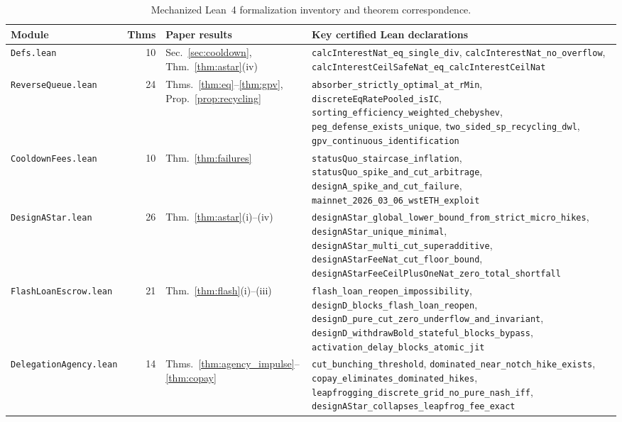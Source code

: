 \begin{table}[t]
\centering
\begin{threeparttable}
\caption{Mechanized Lean~4 formalization inventory and theorem correspondence.}
\label{tab:lean}
\footnotesize
\setlength{\tabcolsep}{4pt}
\begin{tabular}{@{}l r >{\raggedright\arraybackslash}p{2.7cm} >{\raggedright\arraybackslash}p{8.5cm}@{}}
\toprule
Module & Thms & Paper results & Key certified Lean declarations \\
\midrule
\texttt{Defs.lean} & 10 & Sec.~\ref{sec:cooldown}, Thm.~\ref{thm:astar}(iv) &
{\scriptsize\texttt{calcInterestNat\_eq\_single\_div}, \texttt{calcInterestNat\_no\_overflow}, \texttt{calcInterestCeilSafeNat\_eq\_calcInterestCeilNat}} \\
\addlinespace[3pt]
\texttt{ReverseQueue.lean} & 24 & Thms.~\ref{thm:eq}--\ref{thm:gpv}, Prop.~\ref{prop:recycling} &
{\scriptsize\texttt{absorber\_strictly\_optimal\_at\_rMin}, \texttt{discreteEqRatePooled\_isIC}, \texttt{sorting\_efficiency\_weighted\_chebyshev}, \texttt{peg\_defense\_exists\_unique}, \texttt{two\_sided\_sp\_recycling\_dwl}, \texttt{gpv\_continuous\_identification}} \\
\addlinespace[3pt]
\texttt{CooldownFees.lean} & 10 & Thm.~\ref{thm:failures} &
{\scriptsize\texttt{statusQuo\_staircase\_inflation}, \texttt{statusQuo\_spike\_and\_cut\_arbitrage}, \texttt{designA\_spike\_and\_cut\_failure}, \texttt{mainnet\_2026\_03\_06\_wstETH\_exploit}} \\
\addlinespace[3pt]
\texttt{DesignAStar.lean} & 26 & Thm.~\ref{thm:astar}(i)--(iv) &
{\scriptsize\texttt{designAStar\_global\_lower\_bound\_from\_strict\_micro\_hikes}, \texttt{designAStar\_unique\_minimal}, \texttt{designAStar\_multi\_cut\_superadditive}, \texttt{designAStarFeeNat\_cut\_floor\_bound}, \texttt{designAStarFeeCeilPlusOneNat\_zero\_total\_shortfall}} \\
\addlinespace[3pt]
\texttt{FlashLoanEscrow.lean} & 21 & Thm.~\ref{thm:flash}(i)--(iii) &
{\scriptsize\texttt{flash\_loan\_reopen\_impossibility}, \texttt{designD\_blocks\_flash\_loan\_reopen}, \texttt{designD\_pure\_cut\_zero\_underflow\_and\_invariant}, \texttt{designD\_withdrawBold\_stateful\_blocks\_bypass}, \texttt{activation\_delay\_blocks\_atomic\_jit}} \\
\addlinespace[3pt]
\texttt{DelegationAgency.lean} & 14 & Thms.~\ref{thm:agency_impulse}--\ref{thm:copay} &
{\scriptsize\texttt{cut\_bunching\_threshold}, \texttt{dominated\_near\_notch\_hike\_exists}, \texttt{copay\_eliminates\_dominated\_hikes}, \texttt{leapfrogging\_discrete\_grid\_no\_pure\_nash\_iff}, \texttt{designAStar\_collapses\_leapfrog\_fee\_exact}} \\

\end{tabular}
\end{threeparttable}
\end{table}
